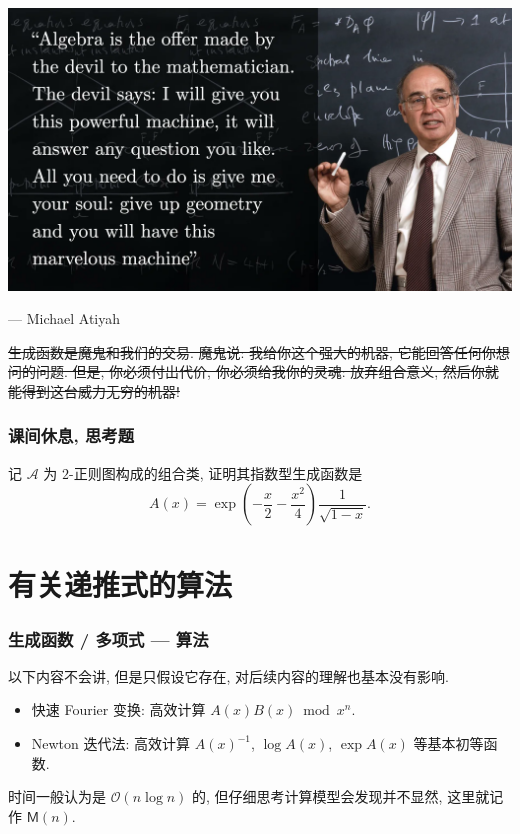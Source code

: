 \documentclass{ctexbeamer}
\newcommand{\bigO}{\mathcal O}
\begin{document}
\frame
{
  \begin{center}
    \includegraphics[scale=0.15]{Atiyah.jpeg}

    \hfill --- Michael Atiyah
  \end{center}
  \sout{生成函数是魔鬼和我们的交易. 魔鬼说: 我给你这个强大的机器, 它能回答任何你想问的问题.
  但是, 你必须付出代价, 你必须给我你的灵魂: 放弃组合意义, 然后你就能得到这台威力无穷的机器!}
}

\begin{frame}
  \frametitle{课间休息, 思考题}

  记 $\mathcal A$ 为 $2$-正则图构成的组合类, 证明其指数型生成函数是
  \begin{equation}
    A(x) = \exp \left( -\frac x 2 - \frac{x^2}{4} \right) \frac 1{\sqrt{1-x}}.
  \end{equation}

\end{frame}

\section{有关递推式的算法}

\frame
{
  \frametitle{生成函数 / 多项式 --- 算法}

  以下内容不会讲, 但是只假设它存在, 对后续内容的理解也基本没有影响.
  \begin{itemize}
    \item 快速 Fourier 变换: 高效计算 $A(x) B(x) \bmod x^n$.
    \item Newton 迭代法: 高效计算 $A(x)^{-1}$, $\log A(x)$, $\exp A(x)$ 等基本初等函数.
  \end{itemize}
  时间一般认为是 $\bigO(n\log n)$ 的, 但仔细思考计算模型会发现并不显然, 这里就记作 $\mathsf M(n)$.
}
\end{document}
